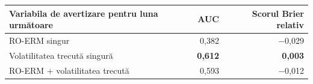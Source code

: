 \begin{tabular}{lrr}
\toprule
Variabila de avertizare pentru luna următoare & AUC & Scorul Brier relativ \\
\midrule
RO-ERM singur & 0,382 & $-$0,029 \\
Volatilitatea trecută singură & \textbf{0,612} & \textbf{0,003} \\
RO-ERM + volatilitatea trecută & 0,593 & $-$0,012 \\
\bottomrule
\end{tabular}
